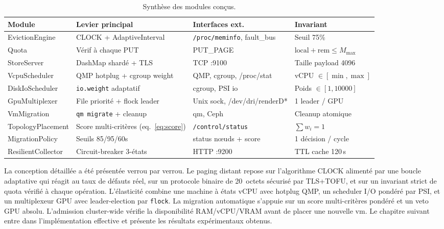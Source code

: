 \begin{table}[H]
\centering
\small
\caption{Synthèse des modules conçus.}
\begin{tabular}{p{3cm}p{3.8cm}p{3.5cm}p{3.2cm}}
\toprule
\textbf{Module} & \textbf{Levier principal} & \textbf{Interfaces ext.} & \textbf{Invariant} \\
\midrule
EvictionEngine    & CLOCK + AdaptiveInterval         & \texttt{/proc/meminfo}, fault\_bus & Seuil 75\% \\
Quota             & Vérif à chaque PUT               & PUT\_PAGE                          & $\text{local}+\text{rem} \le M_{\max}$ \\
StoreServer       & DashMap shardé + TLS             & TCP :9100                          & Taille payload 4096 \\
VcpuScheduler     & QMP hotplug + cgroup weight      & QMP, cgroup, /proc/stat            & vCPU $\in [\min,\max]$ \\
DiskIoScheduler   & \texttt{io.weight} adaptatif     & cgroup, PSI io                     & Poids $\in [1,10000]$ \\
GpuMultiplexer    & File priorité + flock leader     & Unix sock, /dev/dri/renderD*       & 1 leader / GPU \\
VmMigration       & \texttt{qm migrate} + cleanup    & qm, Ceph                           & Cleanup atomique \\
TopologyPlacement & Score multi-critères (eq.~\ref{eq:score}) & \texttt{/control/status}    & $\sum w_i = 1$ \\
MigrationPolicy   & Seuils 85/95/60s                 & status nœuds + score              & 1 décision / cycle \\
ResilientCollector & Circuit-breaker 3-états         & HTTP :9200                         & TTL cache 120\,s \\
\bottomrule
\end{tabular}

\label{tab:synth-conception}
\end{table}


La conception détaillée a été présentée verrou par verrou. Le paging distant repose sur l'algorithme CLOCK alimenté par une boucle adaptative qui réagit au taux de défauts réel, sur un protocole binaire de 20~octets sécurisé par TLS+TOFU, et sur un invariant strict de quota vérifié à chaque opération. L'élasticité combine une machine à états vCPU avec hotplug QMP, un scheduler I/O pondéré par PSI, et un multiplexeur GPU avec leader-election par \texttt{flock}. La migration automatique s'appuie sur un score multi-critères pondéré et un veto GPU absolu. L'admission cluster-wide vérifie la disponibilité RAM/vCPU/VRAM avant de placer une nouvelle \acrshort{vm}. Le chapitre suivant entre dans l'implémentation effective et présente les résultats expérimentaux obtenus.
